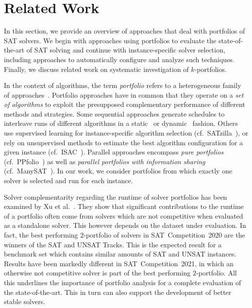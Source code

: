 \documentclass[a4paper,USenglish,pdfa]{lipics-v2021} %
\begin{document}
\section{Related Work}
\label{sec:related-work}

In this section, we provide an overview of approaches that deal with portfolios of SAT solvers. 
We begin with approaches using portfolios to evaluate the state-of-the-art of SAT solving and continue with instance-specific solver selection, including approaches to automatically configure and analyze such techniques. 
Finally, we discuss related work on systematic investigation of $k$-portfolios.

In the context of algorithms, the term \emph{portfolio} refers to a heterogeneous family of approaches~\cite{kerschke2019automated}. 
Portfolio approaches have in common that they operate on a \emph{set of algorithms} to exploit the presupposed complementary performance of different methods and strategies. 
Some sequential approaches generate schedules to interleave runs of different algorithms in a static~\cite{Gomes:2001:AlgoSched} or dynamic~\cite{Carchrae:2005:AlgoSched,Streeter:2007:AlgoSched} fashion. 
Others use supervised learning for instance-specific algorithm selection (cf.~SATzilla~\cite{xu2008satzilla}), or rely on unsupervised methods to estimate the best algorithm configuration for a given instance (cf.~ISAC~\cite{Kadioglu:2010:ISAC}).
Parallel approaches encompass \emph{pure portfolios} (cf.~PPfolio~\cite{Roussel:2012:ppfolio}) as well as \emph{parallel portfolios with information sharing} (cf.~ManySAT~\cite{Hamadi:2009:ManySAT}).
In our work, we consider portfolios from which exactly one solver is selected and run for each instance.

Solver complementarity regarding the runtime of solver portfolios has been examined by Xu et al.~\cite{Xu:2012:EvalContribVBS}. 
They show that significant contributions to the runtime of a portfolio often come from solvers which are not competitive when evaluated as a standalone solver. 
This however depends on the dataset under evaluation. 
In fact, the best performing $2$-portfolio of solvers in SAT~Competition~2020 are the winners of the SAT and UNSAT Tracks.
This is the expected result for a benchmark set which contains similar amounts of SAT and UNSAT instances. 
Results have been markedly different in SAT~Competition~2021, in which an otherwise not competitive solver is part of the best performing $2$-portfolio. 
All this underlines the importance of portfolio analysis for a complete evaluation of the state-of-the-art. 
This in turn can also support the development of better stable solvers.
\end{document}
